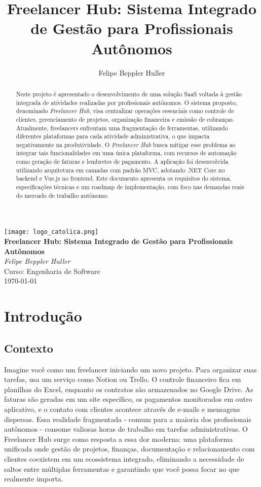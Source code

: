 \documentclass[a4paper,12pt]{article}
\title{Freelancer Hub: Sistema Integrado de Gestão para Profissionais Autônomos}
\author{Felipe Beppler Huller}
\begin{document}
\begin{titlepage}
  \centering
  \texttt{[image: logo\_catolica.png]}\\[2cm]
  {\LARGE \textbf{Freelancer Hub: Sistema Integrado de Gestão para Profissionais Autônomos}}\\[1.5cm]
  {\Large \emph{Felipe Beppler Huller}}\\[0.5cm]
  {\large Curso: Engenharia de Software}\\[0.5cm]
  
  \vfill
  {\large \today}
\end{titlepage}

\tableofcontents
\newpage

\begin{abstract}
Neste projeto é apresentado o desenvolvimento de uma solução SaaS voltada à gestão integrada de atividades realizadas por profissionais autônomos. O sistema proposto, denominado \textit{Freelancer Hub}, visa centralizar operações essenciais como controle de clientes, gerenciamento de projetos, organização financeira e emissão de cobranças. Atualmente, freelancers enfrentam uma fragmentação de ferramentas, utilizando diferentes plataformas para cada atividade administrativa, o que impacta negativamente na produtividade. O \textit{Freelancer Hub} busca mitigar esse problema ao integrar tais funcionalidades em uma única plataforma, com recursos de automação como geração de faturas e lembretes de pagamento. A aplicação foi desenvolvida utilizando arquitetura em camadas com padrão MVC, adotando .NET Core no backend e Vue.js no frontend. Este documento apresenta os requisitos do sistema, especificações técnicas e um roadmap de implementação, com foco nas demandas reais do mercado de trabalho autônomo.
\end{abstract}
\newpage

\section{Introdução}

\subsection{Contexto}
Imagine você como um freelancer iniciando um novo projeto. Para organizar suas tarefas, usa um serviço como Notion ou Trello. O controle financeiro fica em planilhas do Excel, enquanto os contratos são armazenados no Google Drive. As faturas são geradas em um site específico, os pagamentos monitorados em outro aplicativo, e o contato com clientes acontece através de e-mails e mensagens dispersas. Essa realidade fragmentada - comum para a maioria dos profissionais autônomos - consome valiosas horas de trabalho em tarefas administrativas. O Freelancer Hub surge como resposta a essa dor moderna: uma plataforma unificada onde gestão de projetos, finanças, documentação e relacionamento com clientes coexistem em um ecossistema integrado, eliminando a necessidade de saltos entre múltiplas ferramentas e garantindo que você possa focar no que realmente importa.
\end{document}
